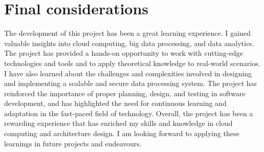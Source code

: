 \section{Final considerations}

The development of this project has been a great learning experience. I gained valuable insights into cloud computing, big data processing, and data analytics. The project has provided a hands-on opportunity to work with cutting-edge technologies and tools and to apply theoretical knowledge to real-world scenarios. I have also learned about the challenges and complexities involved in designing and implementing a scalable and secure data processing system. The project has reinforced the importance of proper planning, design, and testing in software development, and has highlighted the need for continuous learning and adaptation in the fast-paced field of technology. Overall, the project has been a rewarding experience that has enriched my skills and knowledge in cloud computing and architecture design. I am looking forward to applying these learnings in future projects and endeavours.

